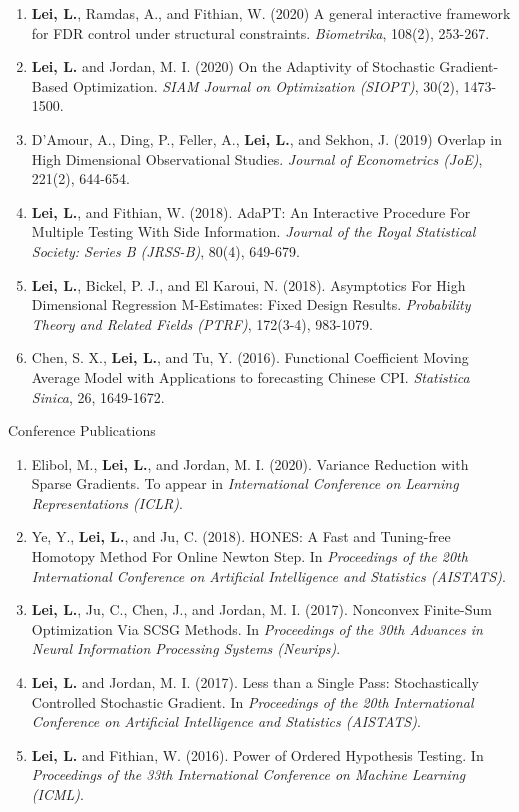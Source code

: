 \documentclass{article}
\begin{document}
\begin{enumerate}
\item \textbf{Lei, L.}, Ramdas, A., and Fithian, W. (2020) A general interactive framework for FDR control under structural constraints. \emph{Biometrika}, 108(2), 253-267.
\item \textbf{Lei, L.} and Jordan, M. I. (2020) On the Adaptivity of Stochastic Gradient-Based Optimization. \emph{SIAM Journal on Optimization (SIOPT)}, 30(2), 1473-1500.
\item D'Amour, A., Ding, P., Feller, A., \textbf{Lei, L.}, and Sekhon, J. (2019) Overlap in High Dimensional Observational Studies. \emph{Journal of Econometrics (JoE)}, 221(2), 644-654.
\item \textbf{Lei, L.}, and Fithian, W. (2018). AdaPT: An Interactive Procedure For Multiple Testing With Side Information. \emph{Journal of the Royal Statistical Society: Series B (JRSS-B)}, 80(4), 649-679.
\item \textbf{Lei, L.}, Bickel, P. J., and El Karoui, N. (2018). Asymptotics For High Dimensional Regression M-Estimates: Fixed Design Results. \emph{Probability Theory and Related Fields (PTRF)}, 172(3-4), 983-1079.
\item Chen, S. X., \textbf{Lei, L.}, and Tu, Y. (2016). Functional Coefficient Moving Average Model with Applications to forecasting Chinese CPI. \emph{Statistica Sinica}, 26, 1649-1672.
\end{enumerate}

\begin{large}
\noindent Conference Publications
\end{large}

\begin{enumerate}
\item Elibol, M., \textbf{Lei, L.}, and Jordan, M. I. (2020). Variance Reduction with Sparse Gradients. To appear in \emph{International Conference on Learning Representations (ICLR)}.
\item Ye, Y., \textbf{Lei, L.}, and Ju, C. (2018). HONES: A Fast and Tuning-free Homotopy Method For Online Newton Step. In \emph{Proceedings of the 20th International Conference on Artificial Intelligence and Statistics (AISTATS)}.
\item \textbf{Lei, L.}, Ju, C., Chen, J., and Jordan, M. I. (2017). Nonconvex Finite-Sum Optimization Via SCSG Methods. In \emph{Proceedings of the 30th Advances in Neural Information Processing Systems (Neurips)}.
\item \textbf{Lei, L.} and Jordan, M. I. (2017). Less than a Single Pass: Stochastically Controlled Stochastic Gradient. In \emph{Proceedings of the 20th International Conference on Artificial Intelligence and Statistics (AISTATS)}.
\item \textbf{Lei, L.} and Fithian, W. (2016). Power of Ordered Hypothesis Testing. In \emph{Proceedings of the 33th International Conference on Machine Learning (ICML)}.
\end{enumerate}
\end{document}
